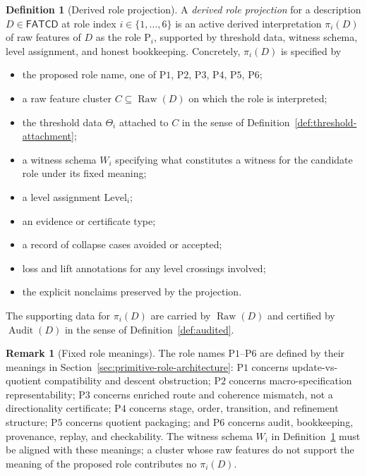 \documentclass[11pt]{article}
\theoremstyle{definition}
\newtheorem{definition}[theorem]{Definition}
\newtheorem{remark}[theorem]{Remark}
\newcommand{\FATCD}{\ensuremath{\mathsf{FATCD}}}
\newcommand{\Raw}[1]{\ensuremath{\operatorname{Raw}\!\left(#1\right)}}
\newcommand{\Audit}[1]{\ensuremath{\operatorname{Audit}\!\left(#1\right)}}
\newcommand{\Pone}{\ensuremath{\mathrm{P1}}}
\newcommand{\Ptwo}{\ensuremath{\mathrm{P2}}}
\newcommand{\Pthree}{\ensuremath{\mathrm{P3}}}
\newcommand{\Pfour}{\ensuremath{\mathrm{P4}}}
\newcommand{\Pfive}{\ensuremath{\mathrm{P5}}}
\newcommand{\Psix}{\ensuremath{\mathrm{P6}}}
\begin{document}
\begin{definition}[Derived role projection]\label{def:role-projection}
A \emph{derived role projection} for a description \(D \in \FATCD{}\) at
role index \(i \in \{1,\ldots,6\}\) is an active derived interpretation
\(\pi_i(D)\) of raw features of \(D\) as the role \(\mathrm{P}_i\), supported
by threshold data, witness schema, level assignment, and honest bookkeeping.
Concretely, \(\pi_i(D)\) is specified by
\begin{itemize}[topsep=2pt,itemsep=1pt]
  \item the proposed role name, one of \Pone{}, \Ptwo{}, \Pthree{},
    \Pfour{}, \Pfive{}, \Psix{};
  \item a raw feature cluster \(C \subseteq \Raw{D}\) on which the role is
    interpreted;
  \item the threshold data \(\Theta_i\) attached to \(C\) in the sense of
    Definition~\ref{def:threshold-attachment};
  \item a witness schema \(W_i\) specifying what constitutes a witness for
    the candidate role under its fixed meaning;
  \item a level assignment \(\mathrm{Level}_i\);
  \item an evidence or certificate type;
  \item a record of collapse cases avoided or accepted;
  \item loss and lift annotations for any level crossings involved;
  \item the explicit nonclaims preserved by the projection.
\end{itemize}
The supporting data for \(\pi_i(D)\) are carried by \(\Raw{D}\) and certified
by \(\Audit{D}\) in the sense of Definition~\ref{def:audited}.
\end{definition}

\begin{remark}[Fixed role meanings]\label{rem:fixed-role-meanings}
The role names \Pone{}--\Psix{} are defined by their meanings in
Section~\ref{sec:primitive-role-architecture}: \Pone{} concerns
update-vs-quotient compatibility and descent obstruction; \Ptwo{} concerns
macro-specification representability; \Pthree{} concerns enriched
route and coherence mismatch, not a directionality certificate; \Pfour{}
concerns stage, order, transition, and refinement structure; \Pfive{}
concerns quotient packaging; and
\Psix{} concerns audit, bookkeeping, provenance, replay, and checkability.
The witness schema \(W_i\) in Definition~\ref{def:role-projection} must be
aligned with these meanings; a cluster whose raw features do not support the
meaning of the proposed role contributes no \(\pi_i(D)\).
\end{remark}
\end{document}
